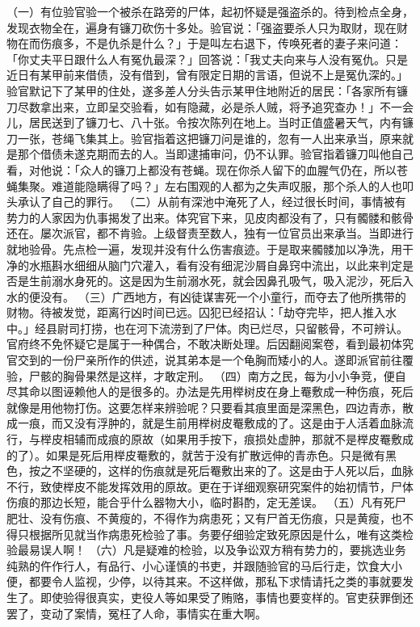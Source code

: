 \documentclass[12pt,UTF8]{ctexbook}
\begin{document}
（一）有位验官验一个被杀在路旁的尸体，起初怀疑是强盗杀的。待到检点全身，发现衣物全在，遍身有镰刀砍伤十多处。验官说：「强盗要杀人只为取财，现在财物在而伤痕多，不是仇杀是什么？」于是叫左右退下，传唤死者的妻子来问道：「你丈夫平日跟什么人有冤仇最深？」回答说：「我丈夫向来与人没有冤仇。只是近日有某甲前来借债，没有借到，曾有限定日期的言语，但说不上是冤仇深的。」验官默记下了某甲的住处，遂多差人分头告示某甲住地附近的居民：「各家所有镰刀尽数拿出来，立即呈交验看，如有隐藏，必是杀人贼，将予追究查办！」不一会儿，居民送到了镰刀七、八十张。令按次陈列在地上。当时正值盛暑天气，内有镰刀一张，苍绳飞集其上。验官指着这把镰刀问是谁的，忽有一人出来承当，原来就是那个借债未遂克期而去的人。当即逮捕审问，仍不认罪。验官指着镰刀叫他自己看，对他说：「众人的镰刀上都没有苍蝇。现在你杀人留下的血腥气仍在，所以苍蝇集聚。难道能隐瞒得了吗？」左右围观的人都为之失声叹服，那个杀人的人也叩头承认了自己的罪行。
（二）从前有深池中淹死了人，经过很长时间，事情被有势力的人家因为仇事揭发了出来。体究官下来，见皮肉都没有了，只有髑髅和骸骨还在。屡次派官，都不肯验。上级督责至数人，独有一位官员出来承当。当即进行就地验骨。先点检一遍，发现并没有什么伤害痕迹。于是取来髑髅加以净洗，用干净的水瓶斟水细细从脑门穴灌入，看有没有细泥沙屑自鼻窍中流出，以此来判定是否是生前溺水身死的。这是因为生前溺水死，就会因鼻孔吸气，吸入泥沙，死后入水的便没有。
（三）广西地方，有凶徒谋害死一个小童行，而夺去了他所携带的财物。待被发觉，距离行凶时间已远。囚犯已经招认：「劫夺完毕，把人推入水中。」经县尉司打捞，也在河下流涝到了尸体。肉已烂尽，只留骸骨，不可辨认。官府终不免怀疑它是属于一种偶合，不敢决断处理。后因翻阅案卷，看到最初体究官交到的一份尸亲所作的供述，说其弟本是一个龟胸而矮小的人。遂即派官前往覆验，尸骸的胸骨果然是这样，才敢定刑。
（四）南方之民，每为小小争竞，便自尽其命以图诬赖他人的是很多的。办法是先用榉树皮在身上罨敷成一种伤痕，死后就像是用他物打伤。这要怎样来辨验呢？只要看其痕里面是深黑色，四边青赤，散成一痕，而又没有浮肿的，就是生前用榉树皮罨敷成的了。这是由于人活着血脉流行，与榉皮相辅而成痕的原故（如果用手按下，痕损处虚肿，那就不是榉皮罨敷成的了）。如果是死后用榉皮罨敷的，就苦于没有扩散远伸的青赤色。只是微有黑色，按之不坚硬的，这样的伤痕就是死后罨敷出来的了。这是由于人死以后，血脉不行，致使榉皮不能发挥效用的原故。更在于详细观察研究案件的始初情节，尸体伤痕的那边长短，能合乎什么器物大小，临时斟酌，定无差误。
（五）凡有死尸肥壮、没有伤痕、不黄瘦的，不得作为病患死；又有尸首无伤痕，只是黄瘦，也不得只根据所见就当作病患死检验了事。务要仔细验定致死原因是什么，唯有这类检验最易误人啊！
（六）凡是疑难的检验，以及争讼双方稍有势力的，要挑选业务纯熟的仵作行人，有品行、小心谨慎的书吏，并跟随验官的马后行走，饮食大小便，都要令人监视，少停，以待其来。不这样做，那私下求情请托之类的事就要发生了。即使验得很真实，吏役人等如果受了贿赂，事情也要变样的。官吏获罪倒还罢了，变动了案情，冤枉了人命，事情实在重大啊。
\end{document}
